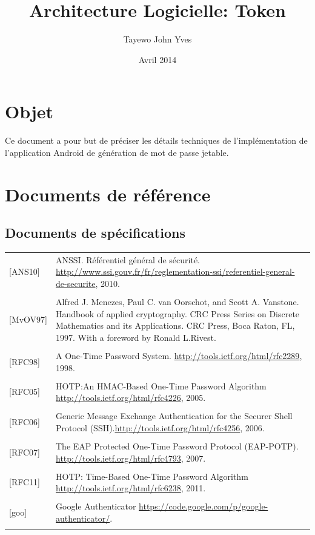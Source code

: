 \documentclass{"../../res/univ-projet"}
\title{Architecture Logicielle: Token}
\author{Tayewo John Yves \bsc{Adegoloye}}
\date{Avril 2014}
\begin{document}
\maketitle
\section{Objet}
Ce document a pour but de préciser les détails techniques de l’implémentation de l’application Android  de génération de mot de passe jetable.

\section{Documents de référence}
\subsection{Documents de spécifications}
\begin{tabular}{p{}>{\raggedright\arraybackslash}p{13cm}}
    {[ANS10]} & {ANSSI. Référentiel général de sécurité. \href{http://www.ssi.gouv.fr/fr/reglementation-ssi/referentiel-general-de-securite}{http://www.ssi.gouv.fr/fr/reglementation-ssi/referentiel-general-de-securite}, 2010.}
    \tabularnewline
    \\
    {[MvOV97]} & {Alfred J. Menezes, Paul C. van Oorschot, and Scott A. Vanstone. Handbook of applied cryptography. CRC Press Series on Discrete Mathematics and its Applications. CRC Press, Boca Raton, FL, 1997. With a foreword by Ronald L.Rivest.}
    \tabularnewline
    \\
    {[RFC98]} & {A One-Time Password System. \href{http://tools.ietf.org/html/rfc2289}{http://tools.ietf.org/html/rfc2289}, 1998.}
    \tabularnewline
    \\
    {[RFC05]} & {HOTP:An HMAC-Based One-Time Password Algorithm \href{http://tools.ietf.org/html/rfc4226}{http://tools.ietf.org/html/rfc4226}, 2005.}
    \tabularnewline
    \\
    {[RFC06]} & {Generic Message Exchange Authentication for the Securer Shell Protocol (SSH).\href{http://tools.ietf.org/html/rfc4256}{http://tools.ietf.org/html/rfc4256}, 2006.}
    \tabularnewline
    \\
    {[RFC07]} & {The EAP Protected One-Time Password Protocol (EAP-POTP). \href{http://tools.ietf.org/html/rfc4793}{http://tools.ietf.org/html/rfc4793}, 2007.}
    \tabularnewline
    \\
    {[RFC11]} & {HOTP: Time-Based One-Time Password Algorithm \href{http://tools.ietf.org/html/rfc6238}{http://tools.ietf.org/html/rfc6238}, 2011.}
    \tabularnewline
    \\
    {[goo]} & {Google Authenticator \href{https://code.google.com/p/google-authenticator/}{https://code.google.com/p/google-authenticator/}.}
    \tabularnewline
    \\
\end{tabular}
\end{document}
